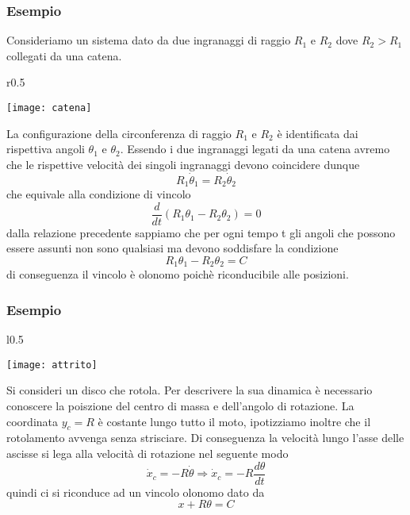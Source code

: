 \subsubsection{Esempio}

Consideriamo un sistema dato da due ingranaggi di raggio $R_1$ e $R_2$ dove $R_2 > R_1$ collegati da una catena.

\begin{wrapfigure}{r}{0.5\textwidth}
  \begin{center}
    \texttt{[image: catena]}
  \end{center}
\end{wrapfigure}
La configurazione della circonferenza di raggio $R_1$ e $R_2$ \`{e} identificata dai rispettiva angoli $\theta_1$ e $\theta_2$. Essendo i due ingranaggi legati da una catena avremo che le rispettive velocit\`{a} dei singoli ingranaggi devono coincidere dunque 
\begin{equation*}
	R_1 \dot{\theta}_{1} = R_2 \dot{\theta}_{2}
\end{equation*}
che equivale alla condizione di vincolo
\begin{equation*}
	\frac{d}{dt}(R_1 \theta_1 - R_2 \theta_2) = 0 
\end{equation*}
dalla relazione precedente sappiamo che per ogni tempo t gli angoli che possono essere assunti non sono qualsiasi ma devono soddisfare la condizione 
\begin{equation*}
	R_1\theta_1 - R_2 \theta_2 = C
\end{equation*}
di conseguenza il vincolo \`{e} olonomo poich\`{e} riconducibile alle posizioni.

\subsubsection{Esempio}
\begin{wrapfigure}{l}{0.5\textwidth}
  \begin{center}
    \texttt{[image: attrito]}
  \end{center}
\end{wrapfigure}
Si consideri un disco che rotola. Per descrivere la sua dinamica \`{e} necessario conoscere la poiszione del centro di massa e dell'angolo di rotazione. La coordinata $y_c = R$ \`{e} costante lungo tutto il moto, ipotizziamo inoltre che il rotolamento avvenga senza strisciare. Di conseguenza la velocit\`{a} lungo l'asse delle ascisse si lega alla velocit\`{a} di rotazione nel seguente modo
\begin{equation*}
	\dot{x}_c = - R\dot{\theta} \Rightarrow \dot{x}_c  = - R \frac{d\theta}{dt}
\end{equation*}
quindi ci si riconduce ad un vincolo olonomo dato da 
\begin{equation*}
	x + R \theta = C
\end{equation*}
